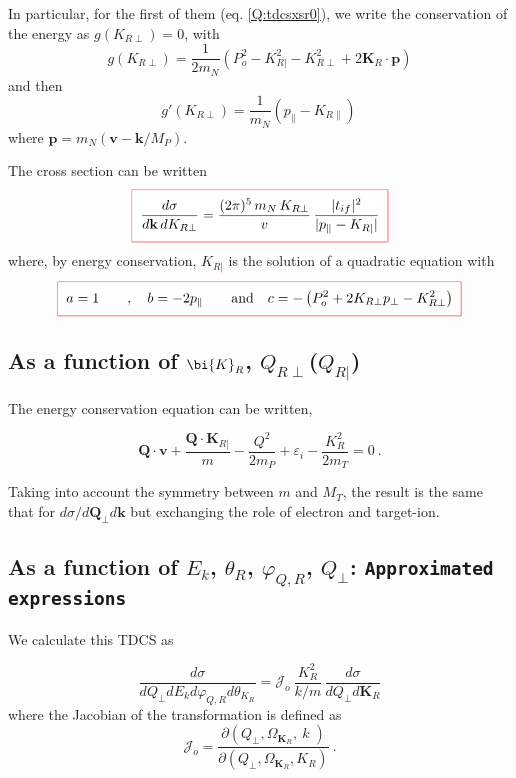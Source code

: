 In particular, for the first of them (eq. \ref{Q:tdcsxsr0}), we write
the conservation of the energy as $g(K_{R \perp}) = 0$, with
$$
g(K_{R \perp}) = \frac{1}{2 m_{N}} \left( P_o^{2} - K_{R | }^{2}
  - K_{R \perp}^{2} + 2 \bm{K}_{R} \cdot \bm{p} \right)
$$
and then
$$
g'(K_{R \perp}) = \frac{1}{m_{N}} \left( p_{\parallel } - K_{R \parallel }
\right) \,
$$
where $\bm{p} = m_{N}\left( \bm{v} - \bm{k}/M_{P}\right)$.

The cross section can be written
\begin{equation}\label{Q:tdcsxyr}
  \fbeq{
\frac{d \sigma}{d \bm{k} \, d K_{R \perp}} = \frac{(2
\pi)^{5}\,m_{N} \, K_{R \perp}}{v} \, \frac{ | t_{if}| ^{2}
}{| p_{\parallel } - K_{R | }| }
  }
\end{equation}
%
where, by energy conservation, $K_{R | }$ is the solution of a
quadratic equation with
%
$$
  \fbeq{
a=1 \qquad,\quad b = -2 p_{\parallel } \qquad \mbox{and} \quad c= -
\left( P_{o}^{2} + 2 K_{R \perp} p_{\perp} - K_{R\perp}^{2} \right)
  }
$$


\subsection{As a function of $\bi{K}_{R}$, $Q_{R \perp}$($Q_{R | }$)}

The energy conservation equation can be written,

\begin{equation}\label{Q:EC2}
\bm{Q} \cdot \textbf{v} + \frac{\bm{Q}\cdot \bm{K}_{R | }}{m} -
\frac{Q^{2}}{2 m_{P}} + \varepsilon_{i} - \frac{K^{2}_{R}}{2 m_{T}} = 0
\ .
\end{equation}

\noindent Taking into account the symmetry between $m$ and $M_{T}$, the
result is the same that for $d\sigma/d \bm{Q}_{\perp} d
\bm{k}$ but exchanging the role of electron and target-ion.

\subsection{As a function of $E_{k}$, $\theta_{R}$,
$\varphi_{Q,R}$, $Q_{\perp}$: { \texttt{Approximated expressions}}}

We calculate this TDCS as

$$
\frac{d\sigma}{d Q_{\perp} d E_k d \varphi_{Q,R} d
\theta_{K_{R}}} = \mathcal{J}_{o} \ \frac{K_{R}^{2}}{k/m} \,
\frac{d\sigma}{d Q_{\perp} d \bm{K}_{R}}
$$
%
where the Jacobian of the transformation is defined as
$$
\mathcal{J}_{o} = \frac{\partial \left( Q_{\perp}, \Omega_{\bm{K}_{R}}
, \ k \; \right) }{\partial \left( Q_{\perp}, \Omega_{\bm{K}_{R}} ,
K_{R} \right)} \ .
$$

